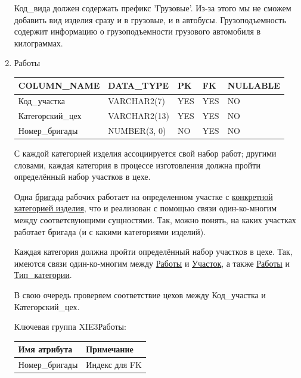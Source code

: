 \begin{enumerate}
\begin{tabular}{|p{7cm}|p{3cm}|p{1cm}|p{1cm}|p{3cm}|}
    \end{tabular}

    Код\_вида должен содержать префикс 'Грузовые'.
    Из-за этого мы не сможем добавить вид изделия сразу и в грузовые, и в автобусы.
    Грузоподъемность содержит информацию о грузоподъемности грузового автомобиля в килограммах.

    \item{Работы}

    \begin{tabular}{|p{7cm}|p{3cm}|p{1cm}|p{1cm}|p{3cm}|} \hline

        {\bf COLUMN\_NAME} & {\bf DATA\_TYPE} & {\bf PK} & {\bf FK} & {\bf NULLABLE} \\ \hline
        Код\_участка & VARCHAR2(7) & YES & YES & NO \\ \hline
        Категорский\_цех & VARCHAR2(13) & YES & YES & NO \\ \hline
        Номер\_бригады & NUMBER(3, 0) & NO & YES & NO \\ \hline

    \end{tabular}

    С каждой категорией изделия ассоциируется свой набор работ;
    другими словами, каждая категория в процессе изготовления должна пройти определённый набор участков в цехе.

    Одна \underline{бригада} рабочих работает на определенном участке с \underline{конкретной категорией изделия}, что и реализован с помощью связи один-ко-многим между соответсвующими сущностями.
    Так, можно понять, на каких участках работает бригада (и с какими категориями изделий).

    Каждая категория должна пройти определённый набор участков в цехе.
    Так, имеются связи один-ко-многим между \underline{Работы} и \underline{Участок}, а также \underline{Работы} и \underline{Тип\_категории}.

    В свою очередь проверяем соответствие цехов между Код\_участка и Категорский\_цех.

    Ключевая группа XIE3Работы:

    \begin{tabular}{|p{7cm}|p{9.3cm}|} \hline

        {\bf Имя атрибута} & {\bf Примечание} \\ \hline
        Номер\_бригады & Индекс для FK \\ \hline

    \end{tabular}


\end{enumerate}
